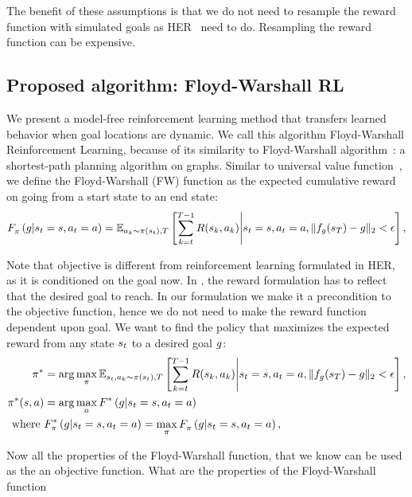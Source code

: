 The benefit of these assumptions is that we do not need to resample the reward
function with simulated goals as HER~\cite{andrychowicz2016learning} need to do.
Resampling the reward function can be expensive.

\subsection{Proposed algorithm: Floyd-Warshall RL}

We present a model-free reinforcement learning method that transfers
learned behavior when goal locations are dynamic. We call this algorithm
Floyd-Warshall Reinforcement Learning, because of its similarity to
Floyd-Warshall algorithm~\cite{floydwarshall1962}:
a shortest-path planning algorithm on graphs. Similar
to universal value function~\cite{schaul2015universal}, we define the Floyd-Warshall
(FW) function as the expected cumulative reward on going from a start
state to an end state:
%
\begin{align}
\fwargs{\state_t = \state}{\act_t = \act}{\goal}{\policy}{} =
\E_{\act_k \sim \policy(\state_t),T}\left[ \sum_{k=t}^{T-1} \Rew(\state_k, \act_k) \middle\vert \state_t = \state, \act_t = \act, \|f_\goal(\state_T) - \goal\|_2 < \epsilon \right] ,
\end{align}%
%

Note that objective is different from reinforcement learning formulated in HER,
as it is conditioned on the goal now. In \citet{andrychowicz2016learning}, the
reward formulation has to reflect that the desired goal to reach. In our formulation
we make it a precondition to the objective function, hence we do not need to
make the reward function dependent upon goal.
We want to find the policy that maximizes the expected reward from any
state $\state_t$ to a desired goal $\goal$:
%
\begin{align}
  \policy^* &=
\arg \max_{\policy} \E_{\state_t, \act_k \sim \policy(\state_t), T}\left[ \sum_{k=t}^{T-1} \Rew(\state_k, \act_k) \middle\vert \state_t = \state, \act_t = \act, \|f_\goal(\state_T) - \goal\|_2 < \epsilon \right],
  \\
  \policy^*(\state, \act) &= \arg \max_{\act} \fwargs{\state_t = \state}{\act_t = \act}{\goal}{}{*}\\
\text{where } &\fwargs{\state_t = \state}{\act_t = \act}{\goal}{\policy}{*} = 
\max_{\policy} \fwargs{\state_t = \state}{\act_t = \act}{\goal}{\policy}{},
\end{align}%
%

Now all the properties of the Floyd-Warshall function, that we know can be used
as the an objective function.
What are the properties of the Floyd-Warshall
function

